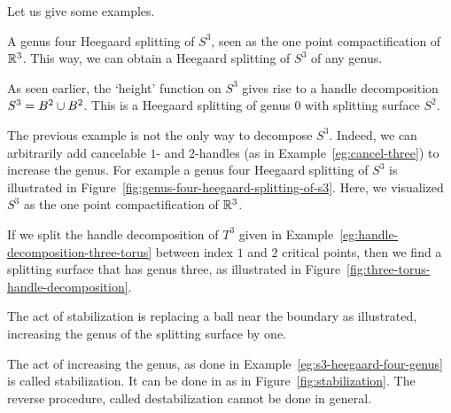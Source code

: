 Let us give some examples.
\begin{marginfigure}
    \centering
    \caption{A genus four Heegaard splitting of $S^{3}$, seen as the one point compactification of $\mathbb{R}^3$.
        This way, we can obtain a Heegaard splitting of $S^{3}$ of any genus.
    }
    \label{fig:genus-four-heegaard-splitting-of-s3}
\end{marginfigure}
\begin{eg}
    As seen earlier, the `height' function on $S^{3}$ gives rise to a handle decomposition $S^{3} = B^{2} \cup B^{2}$. This is a Heegaard splitting of genus $0$ with splitting surface $S^{2}$.
\end{eg}
\begin{eg}
    The previous example is not the only way to decompose $S^{3}$.
    Indeed, we can arbitrarily add cancelable $1$- and $2$-handles (as in Example~\ref{eg:cancel-three}) to increase the genus. 
    For example a genus four Heegaard splitting of $S^{3}$ is illustrated in Figure~\ref{fig:genus-four-heegaard-splitting-of-s3}.
    Here, we visualized $S^{3}$ as the one point compactification of $\mathbb{R}^3$.
    \label{eg:s3-heegaard-four-genus}
\end{eg}

\begin{eg}
    If we split the handle decomposition of $T^{3}$ given in Example~\ref{eg:handle-decomposition-three-torus} between index $1$ and $2$ critical points, then we find a splitting surface that has genus three, as illustrated in Figure~\ref{fig:three-torus-handle-decomposition}.
\end{eg}

\begin{marginfigure}
    \centering
    \caption{
        The act of stabilization is replacing a ball near the boundary as illustrated, increasing the genus of the splitting surface by one.}
    \label{fig:stabilization}
\end{marginfigure}
\begin{remark}
    The act of increasing the genus, as done in Example~\ref{eg:s3-heegaard-four-genus} is called stabilization.
    It can be done in as in Figure~\ref{fig:stabilization}.
    The reverse procedure, called destabilization cannot be done in general.
\end{remark}


